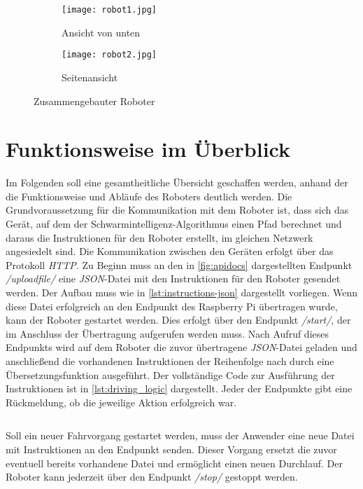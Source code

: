 \begin{figure}[H]
  \centering
  \begin{subfigure}[b]{0.45\textwidth}
    \texttt{[image: robot1.jpg]}
    \caption{Ansicht von unten}
  \end{subfigure}
  \hspace{1cm}
  \begin{subfigure}[b]{0.45\textwidth}
    \texttt{[image: robot2.jpg]}
    \caption{Seitenansicht}
  \end{subfigure}
  \caption{Zusammengebauter Roboter \label{fig:fertiger-roboter}}
\end{figure}

\section{Funktionsweise im Überblick}
Im Folgenden soll eine gesamtheitliche Übersicht geschaffen werden, anhand der die Funktionsweise und Abläufe des Roboters deutlich werden. Die Grundvoraussetzung für die Kommunikation mit dem Roboter ist, dass sich das Gerät, auf dem der Schwarmintelligenz-Algorithmus einen Pfad berechnet und daraus die Instruktionen für den Roboter erstellt, im gleichen Netzwerk angesiedelt sind. Die Kommunikation zwischen den Geräten erfolgt über das Protokoll \textit{HTTP}. Zu Beginn muss an den in \autoref{fig:apidocs} dargestellten Endpunkt \textit{/uploadfile/} eine \textit{JSON}-Datei mit den Instruktionen für den Roboter gesendet werden. Der Aufbau muss wie in \autoref{lst:instructions-json} dargestellt vorliegen. Wenn diese Datei erfolgreich an den Endpunkt des Raspberry Pi übertragen wurde, kann der Roboter gestartet werden. Dies erfolgt über den Endpunkt \textit{/start/}, der im Anschluss der Übertragung aufgerufen werden muss. Nach Aufruf dieses Endpunkts wird auf dem Roboter die zuvor übertragene \textit{JSON}-Datei geladen und anschließend die vorhandenen Instruktionen der Reihenfolge nach durch eine Übersetzungsfunktion ausgeführt. Der vollständige Code zur Ausführung der Instruktionen ist in \autoref{lst:driving_logic} dargestellt. Jeder der Endpunkte gibt eine Rückmeldung, ob die jeweilige Aktion erfolgreich war. 

\inputminted{json}{{assets/code/instructions.json}}
\vspace*{-3mm}
\label{lst:instructions-json}
\vspace*{3mm}

Soll ein neuer Fahrvorgang gestartet werden, muss der Anwender eine neue Datei mit Instruktionen an den Endpunkt senden. Dieser Vorgang ersetzt die zuvor eventuell bereits vorhandene Datei und ermöglicht einen neuen Durchlauf. Der Roboter kann jederzeit über den Endpunkt \textit{/stop/} gestoppt werden.

